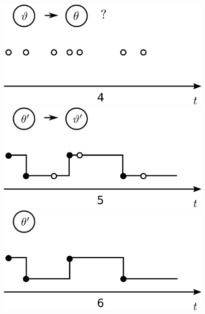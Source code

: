 \begin{figure}[h!]
\begin{minipage}[hp]{0.32\linewidth}
    \vspace{-0 in}
  \end{minipage}
  \begin{minipage}[hp]{0.32\linewidth}
  \centering
    \includegraphics [width=0.96\textwidth, angle=0]{figs/plot3.pdf}
    \vspace{-0 in}
  \end{minipage}
  \begin{minipage}[hp]{0.32\linewidth}
  \centering
    \includegraphics [width=0.96\textwidth, angle=0]{figs/plot5.pdf}
    \vspace{-0 in}
  \end{minipage}
  \begin{minipage}[hp]{0.32\linewidth}
  \centering
    \includegraphics [width=0.96\textwidth, angle=0]{figs/plot6.pdf}

\end{minipage}
\end{figure}
